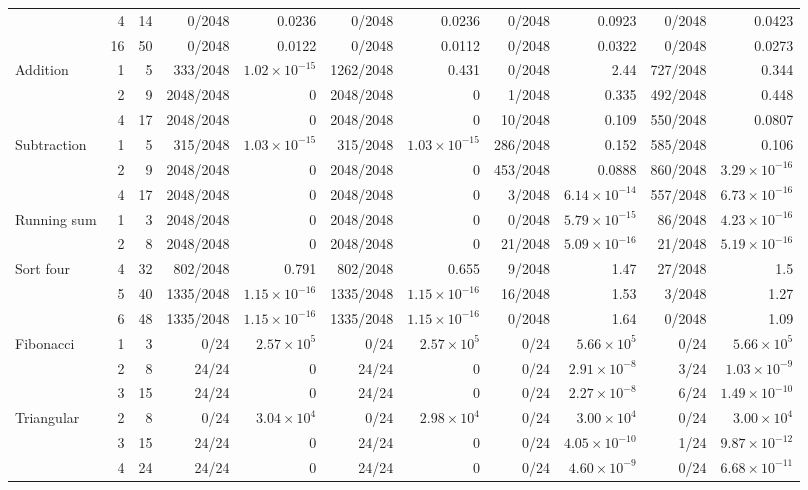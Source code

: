 \begin{table}[htbp]
{\begin{tabular}{@{}lrr *{8}{r}@{}}
 & 4 & 14 & 0/2048 & 0.0236 & 0/2048 & 0.0236 & 0/2048 & 0.0923 & 0/2048 & 0.0423 \\
 & 16 & 50 & 0/2048 & 0.0122 & 0/2048 & 0.0112 & 0/2048 & 0.0322 & 0/2048 & 0.0273 \\
Addition & 1 & 5 & 333/2048 & $1.02\!\times\!10^{-15}$ & 1262/2048 & 0.431 & 0/2048 & 2.44 & 727/2048 & 0.344 \\
 & 2 & 9 & 2048/2048 & 0 & 2048/2048 & 0 & 1/2048 & 0.335 & 492/2048 & 0.448 \\
 & 4 & 17 & 2048/2048 & 0 & 2048/2048 & 0 & 10/2048 & 0.109 & 550/2048 & 0.0807 \\
Subtraction & 1 & 5 & 315/2048 & $1.03\!\times\!10^{-15}$ & 315/2048 & $1.03\!\times\!10^{-15}$ & 286/2048 & 0.152 & 585/2048 & 0.106 \\
 & 2 & 9 & 2048/2048 & 0 & 2048/2048 & 0 & 453/2048 & 0.0888 & 860/2048 & $3.29\!\times\!10^{-16}$ \\
 & 4 & 17 & 2048/2048 & 0 & 2048/2048 & 0 & 3/2048 & $6.14\!\times\!10^{-14}$ & 557/2048 & $6.73\!\times\!10^{-16}$ \\
Running sum & 1 & 3 & 2048/2048 & 0 & 2048/2048 & 0 & 0/2048 & $5.79\!\times\!10^{-15}$ & 86/2048 & $4.23\!\times\!10^{-16}$ \\
 & 2 & 8 & 2048/2048 & 0 & 2048/2048 & 0 & 21/2048 & $5.09\!\times\!10^{-16}$ & 21/2048 & $5.19\!\times\!10^{-16}$ \\
Sort four & 4 & 32 & 802/2048 & 0.791 & 802/2048 & 0.655 & 9/2048 & 1.47 & 27/2048 & 1.5 \\
 & 5 & 40 & 1335/2048 & $1.15\!\times\!10^{-16}$ & 1335/2048 & $1.15\!\times\!10^{-16}$ & 16/2048 & 1.53 & 3/2048 & 1.27 \\
 & 6 & 48 & 1335/2048 & $1.15\!\times\!10^{-16}$ & 1335/2048 & $1.15\!\times\!10^{-16}$ & 0/2048 & 1.64 & 0/2048 & 1.09 \\
Fibonacci & 1 & 3 & 0/24 & $2.57\!\times\!10^{5}$ & 0/24 & $2.57\!\times\!10^{5}$ & 0/24 & $5.66\!\times\!10^{5}$ & 0/24 & $5.66\!\times\!10^{5}$ \\
 & 2 & 8 & 24/24 & 0 & 24/24 & 0 & 0/24 & $2.91\!\times\!10^{-8}$ & 3/24 & $1.03\!\times\!10^{-9}$ \\
 & 3 & 15 & 24/24 & 0 & 24/24 & 0 & 0/24 & $2.27\!\times\!10^{-8}$ & 6/24 & $1.49\!\times\!10^{-10}$ \\
Triangular & 2 & 8 & 0/24 & $3.04\!\times\!10^{4}$ & 0/24 & $2.98\!\times\!10^{4}$ & 0/24 & $3.00\!\times\!10^{4}$ & 0/24 & $3.00\!\times\!10^{4}$ \\
 & 3 & 15 & 24/24 & 0 & 24/24 & 0 & 0/24 & $4.05\!\times\!10^{-10}$ & 1/24 & $9.87\!\times\!10^{-12}$ \\
 & 4 & 24 & 24/24 & 0 & 24/24 & 0 & 0/24 & $4.60\!\times\!10^{-9}$ & 0/24 & $6.68\!\times\!10^{-11}$ \\
\bottomrule
\end{tabular}}
\end{table}

